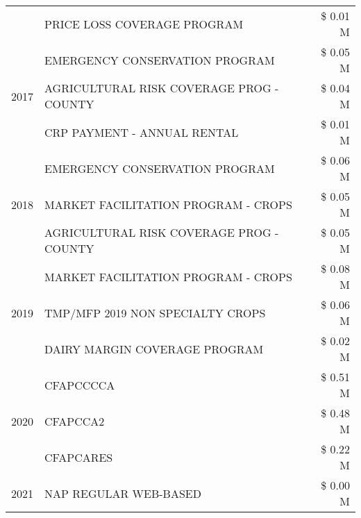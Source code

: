 \begin{tabular}{llr}
 & PRICE LOSS COVERAGE PROGRAM & \$ 0.01 M \\
\cline{1-3}
\multirow[t]{3}{*}{2017} & EMERGENCY CONSERVATION PROGRAM & \$ 0.05 M \\
 & AGRICULTURAL RISK COVERAGE PROG - COUNTY & \$ 0.04 M \\
 & CRP PAYMENT - ANNUAL RENTAL & \$ 0.01 M \\
\cline{1-3}
\multirow[t]{3}{*}{2018} & EMERGENCY CONSERVATION PROGRAM & \$ 0.06 M \\
 & MARKET FACILITATION PROGRAM - CROPS & \$ 0.05 M \\
 & AGRICULTURAL RISK COVERAGE PROG - COUNTY & \$ 0.05 M \\
\cline{1-3}
\multirow[t]{3}{*}{2019} & MARKET FACILITATION PROGRAM - CROPS & \$ 0.08 M \\
 & TMP/MFP 2019 NON SPECIALTY CROPS & \$ 0.06 M \\
 & DAIRY MARGIN COVERAGE PROGRAM & \$ 0.02 M \\
\cline{1-3}
\multirow[t]{3}{*}{2020} & CFAPCCCCA & \$ 0.51 M \\
 & CFAPCCA2 & \$ 0.48 M \\
 & CFAPCARES & \$ 0.22 M \\
\cline{1-3}
2021 & NAP REGULAR WEB-BASED & \$ 0.00 M \\
\cline{1-3}
\bottomrule
\end{tabular}
